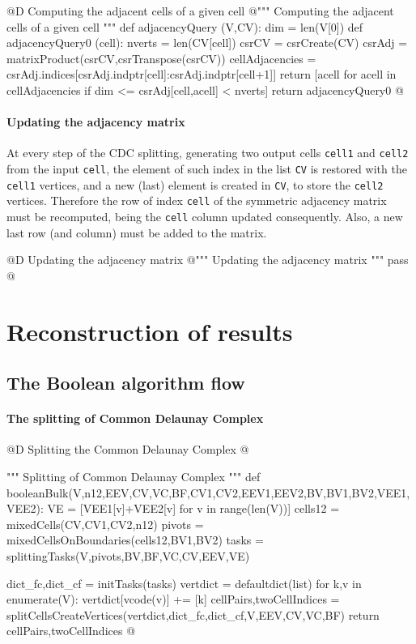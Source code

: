 \documentclass[11pt,oneside]{article}	%
\begin{document}
@D Computing the adjacent cells of a given cell
@{""" Computing the adjacent cells of a given cell """
def adjacencyQuery (V,CV):
	dim = len(V[0])
	def adjacencyQuery0 (cell):
		nverts = len(CV[cell])
		csrCV =  csrCreate(CV)
		csrAdj = matrixProduct(csrCV,csrTranspose(csrCV))
		cellAdjacencies = csrAdj.indices[csrAdj.indptr[cell]:csrAdj.indptr[cell+1]]
		return [acell for acell in cellAdjacencies if dim <= csrAdj[cell,acell] < nverts]
	return adjacencyQuery0
@}

\paragraph{Updating the adjacency matrix}
At every step of the CDC splitting, generating two output cells \texttt{cell1} and  \texttt{cell2} from the input  \texttt{cell}, the element of such index in the list \texttt{CV} is restored with the \texttt{cell1} vertices, and a new (last) element is created in \texttt{CV}, to store the \texttt{cell2} vertices.
Therefore the row of index \texttt{cell} of the symmetric  adjacency matrix must be recomputed, being the \texttt{cell} column updated consequently. Also, a new last row (and column) must be added to the matrix. 

@D Updating the adjacency matrix
@{""" Updating the adjacency matrix """
pass
@}


\section{Reconstruction of results}


\subsection{The Boolean algorithm flow}


\paragraph{The splitting of Common Delaunay Complex}

@D Splitting the Common Delaunay Complex
@{""" Splitting of Common Delaunay Complex """
def booleanBulk(V,n12,EEV,CV,VC,BF,CV1,CV2,EEV1,EEV2,BV,BV1,BV2,VEE1,VEE2):
	VE = [VEE1[v]+VEE2[v] for v in range(len(V))]
	cells12 = mixedCells(CV,CV1,CV2,n12)
	pivots = mixedCellsOnBoundaries(cells12,BV1,BV2)
	tasks = splittingTasks(V,pivots,BV,BF,VC,CV,EEV,VE)
		
	dict_fc,dict_cf = initTasks(tasks)
	vertdict = defaultdict(list)
	for k,v in enumerate(V): vertdict[vcode(v)] += [k]
	cellPairs,twoCellIndices = splitCellsCreateVertices(vertdict,dict_fc,dict_cf,V,EEV,CV,VC,BF)
	return cellPairs,twoCellIndices
@}
\end{document}
